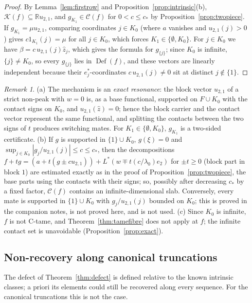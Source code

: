 \documentclass[10pt]{amsart}
\theoremstyle{definition}
\theoremstyle{remark}
\newtheorem{remark}[theorem]{Remark}
\newcommand{\R}{\mathbb R}
\newcommand{\Cset}{\mathcal C}
\newcommand{\Def}{\operatorname{Def}}
\newcommand{\zh}{\hat z}
\begin{document}
\begin{proof}
By Lemma~\ref{lem:firstrow} and Proposition~\ref{prop:intrinsic}(b),
$\mathcal K(f)\subseteq\R u_{2,1}$, and $g_{K_1}\in\Cset(f)$ for $0<c\le c_*$
by Proposition~\ref{prop:twopiece}.  If $g_{K_1}=\mu u_{2,1}$, comparing
coordinates $j\in K_0$ (where $a$ vanishes and $u_{2,1}(j)>0$) gives
$c1_{K_1}(j)=\mu$ for all $j\in K_0$, which forces $K_1\in\{\emptyset,K_0\}$.
For $j\in K_0$ we have $\beta=c\,u_{2,1}(j)\zh_j$, which gives the formula
for $g_{\{j\}}$; since $K_0$ is infinite, $\{j\}\ne K_0$, so every
$g_{\{j\}}$ lies in $\Def(f)$, and these vectors are linearly independent
because their $e_j^*$-coordinates $c\,u_{2,1}(j)\ne0$ sit at distinct
$j\notin\{1\}$.
\end{proof}

\begin{remark}\label{rem:twopiece}
(a) The mechanism is an \emph{exact resonance}: the block vector $u_{2,1}$
of a strict non-peak with $w=0$ is, as a base functional, supported on
$F\cup K_0$ with the contact signs on $K_0$, and $u_{2,1}(\zh)=0$; hence the
block carrier and the contact vector represent the same functional, and
splitting the contacts between the two signs of $t$ produces switching
mates.  For $K_1\in\{\emptyset,K_0\}$, $g_{K_1}$ is a two-sided certificate.
(b) If $g$ is supported in $\{1\}\cup K_0$, $g(\xi)=0$ and
$\sup_{j\in K_0}|g_j/u_{2,1}(j)|\le c\le c_*$, then the decompositions
$f+tg=(a+t(g\pm cu_{2,1}))+L^*(w\mp t(c/\lambda_0)e_2)$ for $\pm t\ge0$
(block part in block $1$) are estimated exactly as in the proof of
Proposition~\ref{prop:twopiece}, the base parts using the contacts with
their signs; so, possibly after decreasing $c_*$ by a fixed factor,
$\Cset(f)$ contains an infinite-dimensional slab.  Conversely, every mate is
supported in $\{1\}\cup K_0$ with $g_j/u_{2,1}(j)$ bounded on $K_0$; this
is proved in the companion notes, is not proved here, and is not used.
(c) Since $K_0$ is infinite, $f$ is not C-tame, and
Theorem~\ref{thm:tamefibre} does not apply at $f$; the infinite contact set
is unavoidable (Proposition~\ref{prop:exact}).
\end{remark}

\subsection{Non-recovery along canonical truncations}
The defect of Theorem~\ref{thm:defect} is defined relative to the known
intrinsic classes; a priori its elements could still be recovered along
every sequence.  For the canonical truncations this is not the case.
\end{document}
